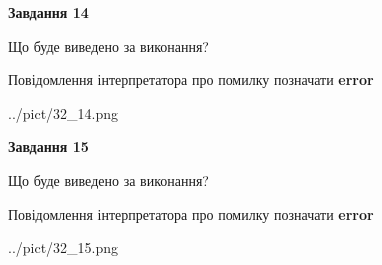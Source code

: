 \documentclass[11pt, ukrainian]{article}
\begin{document}
{\begin {large}
{\begin {center}\textbf{Завдання 14}\end {center}}\par
Що буде виведено за виконання? \par
Повідомлення інтерпретатора про помилку позначати \textbf{error}

\begin{center}
	{../pict/32_14.png}
\end{center}
\newpage

{\begin {center}\textbf{Завдання 15}\end {center}}\par
Що буде виведено за виконання? \par
Повідомлення інтерпретатора про помилку позначати \textbf{error}

\begin{center}
	{../pict/32_15.png}
\end{center}
\newpage

\end {large}}
\end{document}
